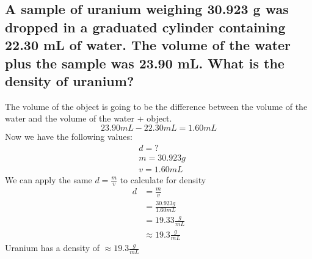\documentclass[11pt]{article}
\begin{document}
\subsection{A sample of uranium weighing 30.923 g was dropped in a graduated cylinder containing 22.30 mL of water. The volume of the water plus the sample was 23.90 mL. What is the density of uranium?}
\label{sec:org12fd442}
The volume of the object is going to be the difference between the volume of the water and the volume of the water + object.
\begin{equation}
23.90mL - 22.30mL = 1.60mL
\end{equation}
Now we have the following values:
\begin{align*}
&d = ?\\
&m = 30.923g\\
&v = 1.60mL
\end{align*}
We can apply the same \(d=\frac{m}{v}\) to calculate for density
\begin{align*}
d&=\frac{m}{v} \\
            &=\frac{30.923g}{1.60mL}\\
            &=19.33\frac{g}{mL}\\
            &\approx19.3\frac{g}{mL}
\end{align*}
Uranium has a density of \(\approx19.3\frac{g}{mL}\)
\end{document}
